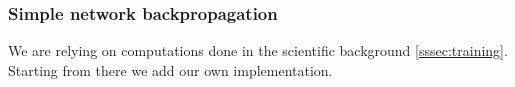 \subsubsection{Simple network backpropagation}

We are relying on computations done in the scientific background \ref{sssec:training}. Starting from there we add our own implementation.
